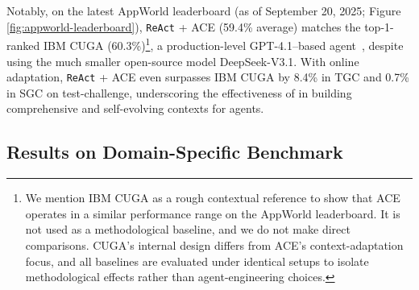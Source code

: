 Notably, on the latest AppWorld leaderboard (as of September 20, 2025; Figure \ref{fig:appworld-leaderboard}), \texttt{ReAct} + ACE (59.4\% average) matches the top-1-ranked IBM CUGA (60.3\%)\footnote{We mention IBM CUGA as a rough contextual reference to show that ACE operates in a similar performance range on the AppWorld leaderboard. It is not used as a methodological baseline, and we do not make direct comparisons. CUGA’s internal design differs from ACE’s context-adaptation focus, and all baselines are evaluated under identical setups to isolate methodological effects rather than agent-engineering choices.}, a production-level GPT-4.1–based agent~\citep{marreed2025towards}, despite using the much smaller open-source model DeepSeek-V3.1.
With online adaptation, \texttt{ReAct} + ACE even surpasses IBM CUGA by 8.4\% in TGC and 0.7\% in SGC on test-challenge, underscoring the effectiveness of \name in building comprehensive and self-evolving contexts for agents.

\subsection{Results on Domain-Specific Benchmark}
\label{subsec:finance-main-results}

